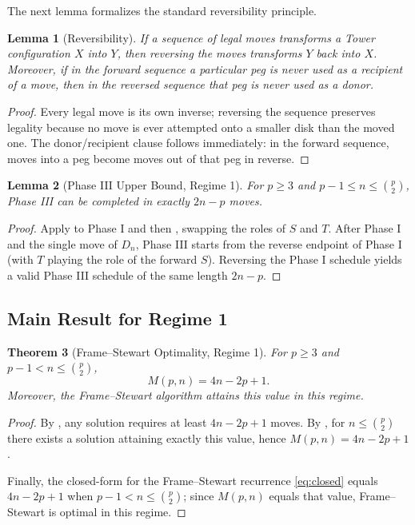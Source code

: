 \documentclass[11pt]{article}
\newtheorem{theorem}{Theorem}
\newtheorem{lemma}[theorem]{Lemma}
\theoremstyle{definition}
\begin{document}
The next lemma formalizes the standard reversibility principle.

\begin{lemma}[Reversibility]\label{lem:reversible}
If a sequence of legal moves transforms a Tower configuration $X$ into $Y$, then reversing the moves transforms $Y$ back into $X$. Moreover, if in the forward sequence a particular peg is never used as a recipient of a move, then in the reversed sequence that peg is never used as a donor.
\end{lemma}

\begin{proof}
Every legal move is its own inverse; reversing the sequence preserves legality because no move is ever attempted onto a smaller disk than the moved one. The donor/recipient clause follows immediately: in the forward sequence, moves into a peg become moves out of that peg in reverse.
\end{proof}

\begin{lemma}[Phase III Upper Bound, Regime 1]\label{lem:phase3-upper}
For $p \geq 3$ and $p-1 \leq n \leq \binom{p}{2}$, Phase III can be completed in exactly $2n-p$ moves.
\end{lemma}

\begin{proof}
Apply  to Phase I and then , swapping the roles of $S$ and $T$. After Phase I and the single move of $D_n$, Phase III starts from the reverse endpoint of Phase I (with $T$ playing the role of the forward $S$). Reversing the Phase I schedule yields a valid Phase III schedule of the same length $2n-p$.
\end{proof}

\subsection{Main Result for Regime 1}

\begin{theorem}[Frame--Stewart Optimality, Regime 1]\label{thm:regime1}
For $p \geq 3$ and $p-1 < n \leq \binom{p}{2}$,
\[
M(p,n) = 4n - 2p + 1.
\]
Moreover, the Frame--Stewart algorithm attains this value in this regime.
\end{theorem}

\begin{proof}
By , any solution requires at least $4n - 2p + 1$ moves. By , for $n \leq \binom{p}{2}$ there exists a solution attaining exactly this value, hence $M(p,n) = 4n - 2p + 1$.

Finally, the closed-form for the Frame--Stewart recurrence \eqref{eq:closed} equals $4n - 2p + 1$ when $p-1 < n \leq \binom{p}{2}$; since $M(p,n)$ equals that value, Frame--Stewart is optimal in this regime.
\end{proof}
\end{document}
